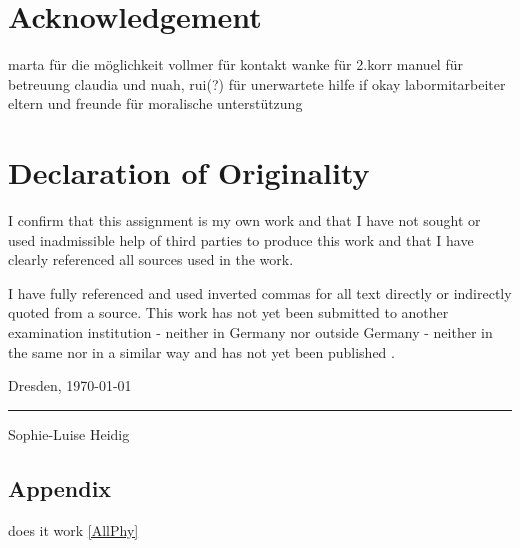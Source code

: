 \documentclass[a4paper]{article}
\begin{document}
\pagebreak




\pagebreak

\thispagestyle{plain}
\mbox{}
\vspace{50pt}
\section{Acknowledgement}
	marta für die möglichkeit
	vollmer für kontakt
	wanke für 2.korr
	manuel für betreuung
	claudia und nuah, rui(?) für unerwartete hilfe if okay
	labormitarbeiter
	eltern und freunde für moralische unterstützung

\pagebreak

\thispagestyle{plain}
\mbox{}
\vspace{50pt}
\section{Declaration of Originality}
	
I confirm that this assignment is my own work and that I have not sought or used inadmissible  help  of  third  parties to  produce  this  work  and that  I  have  clearly  referenced  all  sources  used  in the work. 

I  have  fully  referenced  and  used  inverted  commas  for  all  text  directly  or  indirectly quoted from a source.
This  work  has  not  yet  been  submitted  to  another  examination  institution  - neither  in  Germany nor outside Germany -  neither in the same nor in a similar way and has not yet been published .

\vspace{70pt}
Dresden, \today
\vspace{35pt}

\rule{7cm}{.4pt}\par
Sophie-Luise Heidig

\pagebreak

\begin{landscape}
\section{Appendix}

{ 
}
\end{landscape}
\restoregeometry

does it work \ref{AllPhy}
\end{document}
